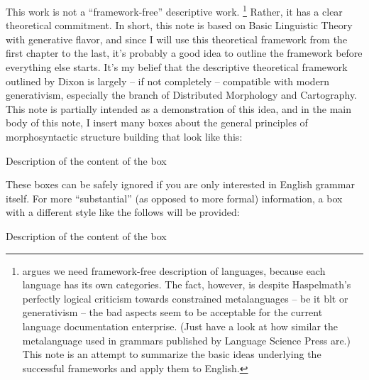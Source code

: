 \documentclass[UTF8, a4paper, oneside, scheme=plain]{ctexrep}
\begin{document}
This work is not a ``framework-free'' descriptive work.%
\footnote{
    \citet{frameworkfree} argues we need framework-free description of languages,
    because each language has its own categories.
    The fact, however, is despite Haspelmath's perfectly logical criticism towards 
    constrained metalanguages -- be it \acl{blt} or generativism -- 
    the bad aspects seem to be acceptable for the current language documentation enterprise.
    (Just have a look at how similar the metalanguage used in grammars published by Language Science Press are.)
    This note is an attempt to summarize the basic ideas underlying 
    the successful frameworks and apply them to English.
}
Rather, it has a clear theoretical commitment.
In short, this note is based on Basic Linguistic Theory \citep{dixon2009basic1,dixon2010basic2,dixon2012basic3}
with generative flavor,
and since I will use this theoretical framework from the first chapter to the last,
it's probably a good idea to outline the framework before everything else starts.
It's my belief that the descriptive theoretical framework outlined by Dixon 
is largely -- if not completely -- compatible with modern generativism,
especially the branch of Distributed Morphology and Cartography.
This note is partially intended as a demonstration of this idea,
and in the main body of this note, 
I insert many boxes about the general principles of morphosyntactic structure building 
that look like this:
\begin{theorybox*}{Description of the content of the box}
\end{theorybox*}
These boxes can be safely ignored if you are only interested in English grammar itself.
For more ``substantial'' (as opposed to more formal) information,
a box with a different style like the follows will be provided:

\begin{infobox*}{Description of the content of the box}
\end{infobox*}
\end{document}
